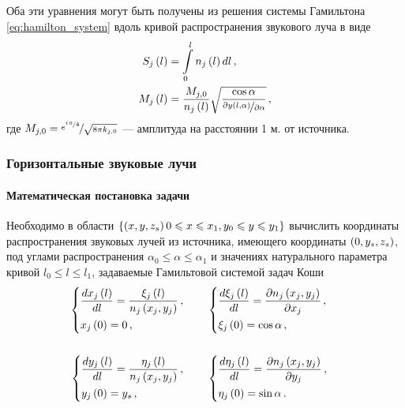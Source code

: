 \documentclass[../document.tex]{subfiles}
\begin{document}
                Оба эти уравнения могут быть получены из решения системы Гамильтона \eqref{eq:hamilton_system} вдоль кривой распространения звукового луча в виде
                \begin{align}
                    S_j\left(l\right)&=\int\limits_0^ln_j\left(l\right)dl\,,\\
                    M_j\left(l\right)&=\frac{M_{j,0}}{n_j\left(l\right)}\sqrt{\frac{\cos\alpha}{\nicefrac{\partial y\left(l,\alpha\right)}{\partial\alpha}}}\,,
                \end{align}
                где $M_{j,0}=\nicefrac{e^{\nicefrac{i\pi}{4}}}{\sqrt{8\pi k_{j,0}}}$ --- амплитуда на расстоянии 1 м. от источника.
        \subsubsection{Горизонтальные звуковые лучи\label{sec::horizontal_rays}}
            \paragraph{Математическая постановка задачи}
                \par Необходимо в области $\left\{\left(x,y,z_s\right)0\leqslant x\leqslant x_1,y_0\leqslant y\leqslant y_1\right\}$ вычислить координаты распространения звуковых лучей из источника, имеющего координаты $\left(0,y_s,z_s\right)$, под углами распространения $\alpha_0\leqslant\alpha\leqslant\alpha_1$ и значениях натурального параметра кривой $l_0\leqslant l\leqslant l_1$, задаваемые Гамильтовой системой задач Коши
                \begin{equation}
                    \begin{aligned}
                        \begin{dcases}
                            \frac{dx_j\left(l\right)}{dl}=\frac{\xi_j\left(l\right)}{n_j\left(x_j,y_j\right)}\,,\\
                            x_j\left(0\right)=0\,,
                        \end{dcases}&\qquad
                        \begin{dcases}
                            \frac{d\xi_j\left(l\right)}{dl}=\frac{\partial n_j\left(x_j,y_j\right)}{\partial x_j}\,,\\
                            \xi_j\left(0\right)=\cos\alpha\,,
                        \end{dcases}\\
                        &&\\
                        \begin{dcases}
                            \frac{dy_j\left(l\right)}{dl}=\frac{\eta_j\left(l\right)}{n_j\left(x_j,y_j\right)}\,,\\
                            y_j\left(0\right)=y_s\,,
                        \end{dcases}&\qquad
                        \begin{dcases}
                            \frac{d\eta_j\left(l\right)}{dl}=\frac{\partial n_j\left(x_j,y_j\right)}{\partial y_j}\,,\\
                            \eta_j\left(0\right)=\sin\alpha\,.
                        \end{dcases}
                    \end{aligned}
                \end{equation}
\end{document}
